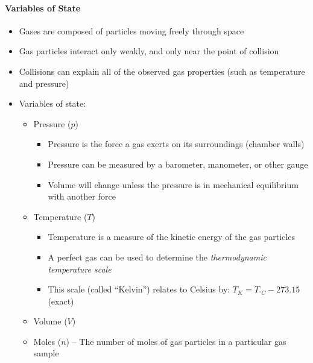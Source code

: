 \documentclass[12pt, openany, letterpaper]{memoir}
\begin{document}
\paragraph{Variables of State}
\begin{itemize}
	\item Gases are composed of particles moving freely through space
	\item Gas particles interact only weakly, and only near the point of collision
	\item Collisions can explain all of the observed gas properties (such as temperature and pressure)
	\item Variables of state:
	\begin{itemize}
		\item Pressure ($p$)
		\begin{itemize}
			\item Pressure is the force a gas exerts on its surroundings (chamber walls)
			\item Pressure can be measured by a barometer, manometer, or other gauge
			\item Volume will change unless the pressure is in mechanical equilibrium with another force
		\end{itemize} 
		\item Temperature ($T$)
		\begin{itemize}
			\item Temperature is a measure of the kinetic energy of the gas particles
			\item A perfect gas can be used to determine the \emph{thermodynamic temperature scale}
			\item This scale (called ``Kelvin'') relates to Celsius by: $T_K = T_{^\circ C} - 273.15$ (exact)
		\end{itemize}
		\item Volume ($V$)
		\item Moles ($n$) -- The number of moles of gas particles in a particular gas sample
	\end{itemize}
\end{itemize}
\end{document}
